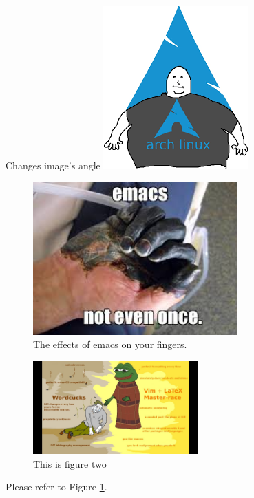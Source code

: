 \documentclass{article}
\begin{document}
\begin{center}
Changes image's angle
\includegraphics[angle=90]{linux.png}
\end{center}

\blindtext

\begin{figure}[h]
\centering
\includegraphics[width=0.7\textwidth]{emacs.jpg}
\caption{The effects of emacs on your fingers.}
\end{figure}

\blindtext

\blindtext

\blindtext

\begin{figure}
\centering
\includegraphics[width=2.5in]{vim_latex.jpg}
\caption{This is figure two\label{latexpic}}
\end{figure}

Please refer to Figure \ref{latexpic}.

\blindtext

\blindtext

\blindtext
\end{document}
